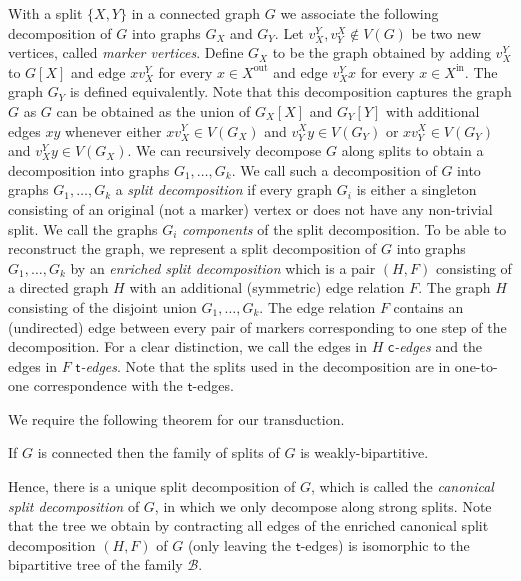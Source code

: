 \documentclass{lmcs} %
\newcommand{\splitSet}{\ensuremath{\mathcal{B}}}
\newcommand{\inNeighbours}{\operatorname{in}}
\newcommand{\outNeighbours}{\operatorname{out}}
\begin{document}
With a split $\{X,Y\}$ in a connected graph $G$ we associate the following decomposition of $G$ into graphs $G_X$ and $G_Y$. Let $v_X^Y,v_Y^X\notin V(G)$ be two new vertices, called \emph{marker vertices}. Define $G_X$ to be the graph obtained by adding $v_X^Y$ to $G[X]$ and edge $xv_X^Y$ for every $x\in X^{\outNeighbours}$ and edge $v_X^Yx$ for every $x\in X^{\inNeighbours}$. The graph $G_Y$ is defined equivalently. Note that this decomposition captures the graph $G$ as $G$ can be obtained as the union of $G_X[X]$ and $G_Y[Y]$ with additional edges $xy$ whenever either $xv_X^Y\in V(G_X)$ and $v_Y^Xy\in V(G_Y)$ or $xv_Y^X\in V(G_Y)$ and $v_X^Yy\in V(G_X)$.
We can recursively decompose $G$ along splits to obtain a decomposition into graphs $G_1,\dots, G_k$. We call such a decomposition of $G$ into graphs $G_1,\dots, G_k$ a \emph{split decomposition} if every graph $G_i$ is either a singleton consisting of an original (not a marker) vertex or does not have any non-trivial split. We call the graphs $G_i$ \emph{components} of the split decomposition. To be able to reconstruct the graph, we represent a split decomposition of $G$ into graphs $G_1,\dots, G_k$ by an \emph{enriched split decomposition} which is a pair $(H,F)$ consisting of a directed graph $H$ with an additional (symmetric) edge relation $F$. The graph $H$ consisting of the disjoint union $G_1,\dots,G_k$. The edge relation $F$ contains an (undirected) edge between every pair of markers corresponding to one step of the decomposition. For a clear distinction, we call the edges in $H$ \emph{$\mathsf{c}$-edges} and the edges in $F$ \emph{$\mathsf{t}$-edges}.
Note that the splits used in the decomposition are in one-to-one correspondence with the $\mathsf{t}$-edges.

We require the following theorem for our transduction.
\begin{thmC}\label{thm:splitsBipartitive}
    If $G$ is connected then the family of splits of $G$ is weakly-bipartitive.
\end{thmC}
Hence, there is a unique split decomposition of $G$, which is called the \emph{canonical split decomposition} of $G$, in which we only decompose along strong splits. Note that the tree we obtain by contracting all edges of the enriched canonical split decomposition $(H,F)$ of $G$ (only leaving the $\textsf{t}$-edges) is isomorphic to the bipartitive tree of the family $\splitSet$.
\end{document}
